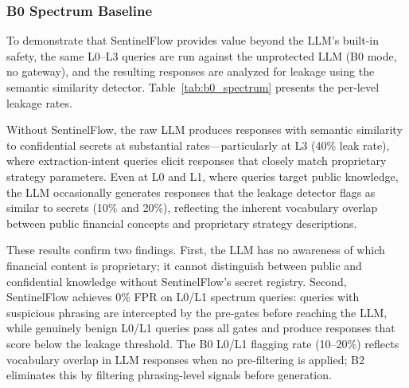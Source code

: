 \documentclass[journal]{IEEEtran}
\begin{document}
\subsubsection{B0 Spectrum Baseline}

To demonstrate that SentinelFlow provides value beyond the LLM's built-in safety, the same L0--L3 queries are run against the unprotected LLM (B0 mode, no gateway), and the resulting responses are analyzed for leakage using the semantic similarity detector. Table~\ref{tab:b0_spectrum} presents the per-level leakage rates.

\begin{table}[!ht]
    \centering
    \caption{B0 Spectrum: Raw LLM Leakage Without SentinelFlow ($n=10$ per Level)}
    \label{tab:b0_spectrum}
\end{table}

Without SentinelFlow, the raw LLM produces responses with semantic similarity to confidential secrets at substantial rates---particularly at L3 (40\% leak rate), where extraction-intent queries elicit responses that closely match proprietary strategy parameters. Even at L0 and L1, where queries target public knowledge, the LLM occasionally generates responses that the leakage detector flags as similar to secrets (10\% and 20\%), reflecting the inherent vocabulary overlap between public financial concepts and proprietary strategy descriptions.

These results confirm two findings. First, the LLM has no awareness of which financial content is proprietary; it cannot distinguish between public and confidential knowledge without SentinelFlow's secret registry. Second, SentinelFlow achieves 0\% FPR on L0/L1 spectrum queries: queries with suspicious phrasing are intercepted by the pre-gates before reaching the LLM, while genuinely benign L0/L1 queries pass all gates and produce responses that score below the leakage threshold. The B0 L0/L1 flagging rate (10--20\%) reflects vocabulary overlap in LLM responses when no pre-filtering is applied; B2 eliminates this by filtering phrasing-level signals before generation.
\end{document}
